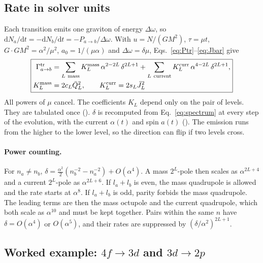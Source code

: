 \documentclass[11pt]{article}
\newcommand{\dd}{\mathrm{d}}
\newcommand{\code}[1]{\path{#1}}
\begin{document}
\subsection{Rate in solver units}

Each transition emits one graviton of energy $\Delta\omega$, so $\dd N_a/\dd t=-\dd N_b/\dd t=-P_{a\to b}/\Delta\omega$. With $u=N/(GM^2)$, $\tau=\mu t$, $G\cdot GM^2=\alpha^2/\mu^2$, $a_0=1/(\mu\alpha)$ and $\Delta\omega=\delta\mu$, Eqs.~\eqref{eq:Ptr}--\eqref{eq:Jbar} give
\begin{equation}
\boxed{\begin{aligned}
\Gamma^{\rm tr}_{a\to b}&=\sum_{L\ \rm mass}K^{\rm mass}_L\,\alpha^{2-2L}\,\delta^{2L+1}+\sum_{L\ \rm current}K^{\rm curr}_L\,\alpha^{4-2L}\,\delta^{2L+1},\\
K^{\rm mass}_L&=2c_L\bar Q_L^2,\qquad K^{\rm curr}_L=2s_L\bar J_L^2
\end{aligned}}
\label{eq:Gtr}
\end{equation}
All powers of $\mu$ cancel. The coefficients $K_L$ depend only on the pair of levels. They are tabulated once (\code{gw_build_nr_table}). $\delta$ is recomputed from Eq.~\eqref{eq:spectrum} at every step of the evolution, with the current $\alpha(t)$ and spin $a(t)$ (\code{gw_rhs!}). The emission runs from the higher to the lower level, so the direction can flip if two levels cross.

\paragraph{Power counting.} For $n_a\neq n_b$, $\delta=\tfrac{\alpha^2}2(n_b^{-2}-n_a^{-2})+O(\alpha^4)$. A mass $2^L$-pole then scales as $\alpha^{2L+4}$ and a current $2^L$-pole as $\alpha^{2L+6}$. If $l_a+l_b$ is even, the mass quadrupole is allowed and the rate starts at $\alpha^8$. If $l_a+l_b$ is odd, parity forbids the mass quadrupole. The leading terms are then the mass octupole and the current quadrupole, which both scale as $\alpha^{10}$ and must be kept together. Pairs within the same $n$ have $\delta=O(\alpha^4)$ or $O(\alpha^5)$, and their rates are suppressed by $(\delta/\alpha^2)^{2L+1}$.

\subsection{Worked example: \texorpdfstring{$4f\to3d$ and $3d\to2p$}{4f to 3d and 3d to 2p}}
\end{document}
